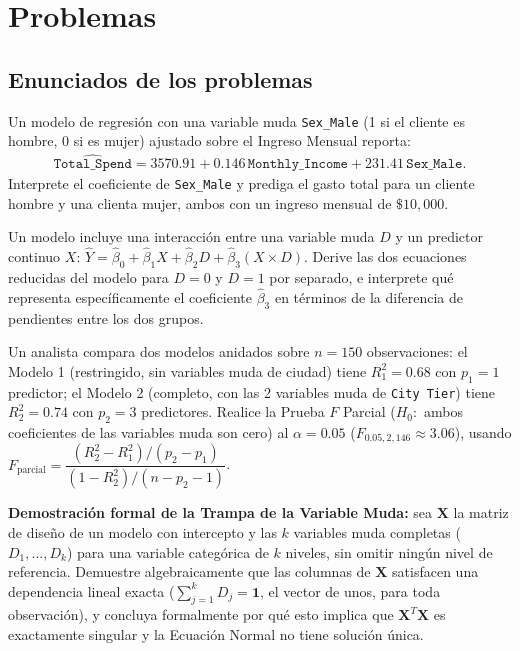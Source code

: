 \section*{Problemas}

\subsection*{Enunciados de los problemas}

\begin{problema}
	\label{prob:9556f7f}
	Un modelo de regresión con una variable muda \texttt{Sex\_Male} (1 si el cliente es hombre, 0 si es mujer) ajustado sobre el Ingreso Mensual reporta:
	\begin{align}
		\hat{\texttt{Total\_Spend}} = 3570.91 + 0.146\,\texttt{Monthly\_Income} + 231.41\,\texttt{Sex\_Male}.
	\end{align}
	Interprete el coeficiente de \texttt{Sex\_Male} y prediga el gasto total para un cliente hombre y una clienta mujer, ambos con un ingreso mensual de $\$10{,}000$.
\end{problema}

\begin{problema}
	\label{prob:f520b9b}
	Un modelo incluye una interacción entre una variable muda $D$ y un predictor continuo $X$: $\hat Y=\hat\beta_0+\hat\beta_1X+\hat\beta_2D+\hat\beta_3(X\times D)$. Derive las dos ecuaciones reducidas del modelo para $D=0$ y $D=1$ por separado, e interprete qué representa específicamente el coeficiente $\hat\beta_3$ en términos de la diferencia de pendientes entre los dos grupos.
\end{problema}

\begin{problema}
	\label{prob:5652f5a}
	Un analista compara dos modelos anidados sobre $n=150$ observaciones: el Modelo 1 (restringido, sin variables muda de ciudad) tiene $R_1^2=0.68$ con $p_1=1$ predictor; el Modelo 2 (completo, con las 2 variables muda de \texttt{City Tier}) tiene $R_2^2=0.74$ con $p_2=3$ predictores. Realice la Prueba $F$ Parcial ($H_0:$ ambos coeficientes de las variables muda son cero) al $\alpha=0.05$ ($F_{0.05,2,146}\approx3.06$), usando $F_{\text{parcial}}=\dfrac{(R_2^2-R_1^2)/(p_2-p_1)}{(1-R_2^2)/(n-p_2-1)}$.
\end{problema}

\begin{problema}
	\label{prob:43c3e82}
	\textbf{Demostración formal de la Trampa de la Variable Muda:} sea $\mathbf{X}$ la matriz de diseño de un modelo con intercepto y las $k$ variables muda completas ($D_1,\ldots,D_k$) para una variable categórica de $k$ niveles, sin omitir ningún nivel de referencia. Demuestre algebraicamente que las columnas de $\mathbf{X}$ satisfacen una dependencia lineal exacta ($\sum_{j=1}^k D_j = \mathbf{1}$, el vector de unos, para toda observación), y concluya formalmente por qué esto implica que $\mathbf{X}^T\mathbf{X}$ es exactamente singular y la Ecuación Normal no tiene solución única.
\end{problema}

